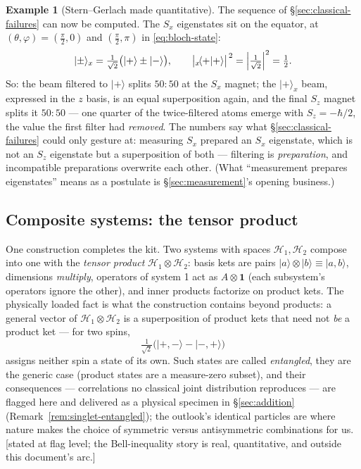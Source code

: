 \documentclass[11pt]{article}
\theoremstyle{plain}
\theoremstyle{definition}
\newtheorem{example}[theorem]{Example}
\theoremstyle{remark}
\newcommand{\idop}{\mathbf{1}}  %
\newcommand{\ket}[1]{\lvert #1 \rangle}
\newcommand{\braket}[2]{\langle #1 | #2 \rangle}
\begin{document}
\begin{example}[Stern--Gerlach made quantitative]\label{ex:SG-quant}
The sequence of \S\ref{sec:classical-failures} can now be computed.
The $S_x$ eigenstates sit on the equator, at
$(\theta, \varphi) = (\tfrac\pi2, 0)$ and $(\tfrac\pi2, \pi)$ in
\eqref{eq:bloch-state}:
\begin{equation}
  \ket\pm_x = \tfrac{1}{\sqrt2}\bigl(\ket+ \pm \ket-\bigr),
  \qquad
  \bigl|{}_x\!\braket{+}{+}\bigr|^{\,2}
  = \Bigl|\tfrac{1}{\sqrt2}\Bigr|^2 = \tfrac12 .
\end{equation}
So: the beam filtered to $\ket+$ splits $50{:}50$ at the $S_x$
magnet; the $\ket+_x$ beam, expressed in the $z$ basis, is an equal
superposition again, and the final $S_z$ magnet splits it
$50{:}50$ --- one quarter of the twice-filtered atoms emerge with
$S_z = -\hbar/2$, the value the first filter had \emph{removed}. The
numbers say what \S\ref{sec:classical-failures} could only gesture
at: measuring $S_x$ prepared an $S_x$ eigenstate, which is not an
$S_z$ eigenstate but a superposition of both --- filtering is
\emph{preparation}, and incompatible preparations overwrite each
other. (What ``measurement prepares eigenstates'' means as a
postulate is \S\ref{sec:measurement}'s opening business.)
\end{example}

\subsection{Composite systems: the tensor product}
\label{sec:tensor-product}

One construction completes the kit. Two systems with spaces
$\mathcal H_1, \mathcal H_2$ compose into one with the \emph{tensor
product} $\mathcal H_1 \otimes \mathcal H_2$: basis kets are pairs
$\ket{a}\otimes\ket{b} \equiv \ket{a, b}$, dimensions
\emph{multiply}, operators of system 1 act as $A \otimes \idop$
(each subsystem's operators ignore the other), and inner products
factorize on product kets. The physically loaded fact is what the
construction contains beyond products: a general vector of
$\mathcal H_1 \otimes \mathcal H_2$ is a superposition of product
kets that need not \emph{be} a product ket --- for two spins,
\begin{equation}
  \tfrac{1}{\sqrt2}\bigl(
    \ket{+,-} - \ket{-,+}
  \bigr)
\end{equation}
assigns neither spin a state of its own. Such states are called
\emph{entangled}, they are the generic case (product states are a
measure-zero subset), and their consequences --- correlations no
classical joint distribution reproduces --- are flagged here and
delivered as a physical specimen in \S\ref{sec:addition}
(Remark~\ref{rem:singlet-entangled}); the outlook's identical
particles are where nature makes the choice of symmetric versus
antisymmetric combinations for us. [stated at flag level; the Bell-inequality
story is real, quantitative, and outside this document's arc.]
\end{document}

